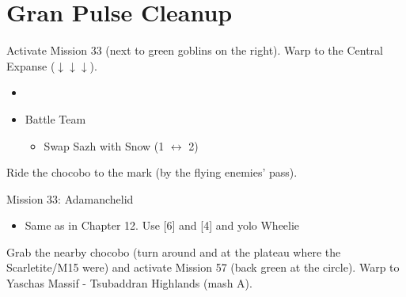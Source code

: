 \chapter{Gran Pulse Cleanup}

Activate Mission 33 (next to green goblins on the right).
Warp to the Central Expanse ($\downarrow\downarrow\downarrow$).

\begin{menu}
	\begin{itemize}
	\paradigm
		\begin{itemize}
			\item {}%
				{\paradigmline{\com}{(\com)}{\com}}%
				{\paradigmline{\com}{(\com)}{\sab}}%
				{\paradigmline{(\com)}{\sen}{(\med)}}%
				{\paradigmline{(\syn)}{(\rav)}{(\sab)}}%
				{\paradigmline{\syn}{\sen}{\med}}%
				{\paradigmline[4]{(\rav)}{\rav}{\sab}}%
			\item Battle Team
				\begin{itemize}
					\item Swap Sazh with Snow (1 $\leftrightarrow$ 2)
				\end{itemize}
		\end{itemize}
	\end{itemize}
\end{menu}

\renewcommand{\first}{[1] Cerberus (\com/\com/\com)}
\renewcommand{\second}{[2] Devastation (\com/\com/\sab)}
\renewcommand{\third}{[3] Solidarity (\com/\sen/\med)}
\renewcommand{\fourth}{[4] Guerilla (\syn/\rav/\sab)}
\renewcommand{\fifth}{[5] Protection (\syn/\sen/\med)}
\renewcommand{\sixth}{[6] Smart Bomb (\rav/\rav/\sab)}

Ride the chocobo to the mark (by the flying enemies' pass).

\begin{battle}{Mission 33: Adamanchelid}
	\begin{itemize}
		\item Same as in Chapter 12. Use [6] and [4] and yolo Wheelie
	\end{itemize}
\end{battle}

Grab the nearby chocobo (turn around and at the plateau where the Scarletite/M15 were) and activate Mission 57 (back green at the circle).
Warp to Yaschas Massif - Tsubaddran Highlands (mash A).

